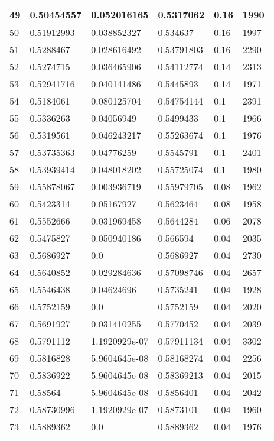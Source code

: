 \begin{longtable}{|l|l|l|l|l|l|}
49 & 0.50454557 & 0.052016165 & 0.5317062 & 0.16 & 1990 \\ \hline 
50 & 0.51912993 & 0.038852327 & 0.534637 & 0.16 & 1997 \\ \hline 
51 & 0.5288467 & 0.028616492 & 0.53791803 & 0.16 & 2290 \\ \hline 
52 & 0.5274715 & 0.036465906 & 0.54112774 & 0.14 & 2313 \\ \hline 
53 & 0.52941716 & 0.040141486 & 0.5445893 & 0.14 & 1971 \\ \hline 
54 & 0.5184061 & 0.080125704 & 0.54754144 & 0.1 & 2391 \\ \hline 
55 & 0.5336263 & 0.04056949 & 0.5499433 & 0.1 & 1966 \\ \hline 
56 & 0.5319561 & 0.046243217 & 0.55263674 & 0.1 & 1976 \\ \hline 
57 & 0.53735363 & 0.04776259 & 0.5545791 & 0.1 & 2401 \\ \hline 
58 & 0.53939414 & 0.048018202 & 0.55725074 & 0.1 & 1980 \\ \hline 
59 & 0.55878067 & 0.003936719 & 0.55979705 & 0.08 & 1962 \\ \hline 
60 & 0.5423314 & 0.05167927 & 0.5623464 & 0.08 & 1958 \\ \hline 
61 & 0.5552666 & 0.031969458 & 0.5644284 & 0.06 & 2078 \\ \hline 
62 & 0.5475827 & 0.050940186 & 0.566594 & 0.04 & 2035 \\ \hline 
63 & 0.5686927 & 0.0 & 0.5686927 & 0.04 & 2730 \\ \hline 
64 & 0.5640852 & 0.029284636 & 0.57098746 & 0.04 & 2657 \\ \hline 
65 & 0.5546438 & 0.04624696 & 0.5735241 & 0.04 & 1928 \\ \hline 
66 & 0.5752159 & 0.0 & 0.5752159 & 0.04 & 2020 \\ \hline 
67 & 0.5691927 & 0.031410255 & 0.5770452 & 0.04 & 2039 \\ \hline 
68 & 0.5791112 & 1.1920929e-07 & 0.57911134 & 0.04 & 3302 \\ \hline 
69 & 0.5816828 & 5.9604645e-08 & 0.58168274 & 0.04 & 2256 \\ \hline 
70 & 0.5836922 & 5.9604645e-08 & 0.58369213 & 0.04 & 2015 \\ \hline 
71 & 0.58564 & 5.9604645e-08 & 0.5856401 & 0.04 & 2042 \\ \hline 
72 & 0.58730996 & 1.1920929e-07 & 0.5873101 & 0.04 & 1960 \\ \hline 
73 & 0.5889362 & 0.0 & 0.5889362 & 0.04 & 1976 \\ \hline 

\end{longtable}
